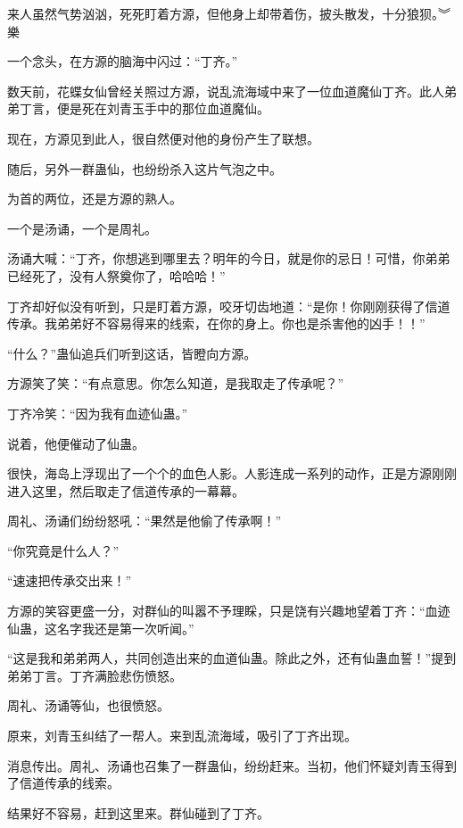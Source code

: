 
\begin{this_body}



来人虽然气势汹汹，死死盯着方源，但他身上却带着伤，披头散发，十分狼狈。︾樂

一个念头，在方源的脑海中闪过：“丁齐。”

数天前，花蝶女仙曾经关照过方源，说乱流海域中来了一位血道魔仙丁齐。此人弟弟丁言，便是死在刘青玉手中的那位血道魔仙。

现在，方源见到此人，很自然便对他的身份产生了联想。

随后，另外一群蛊仙，也纷纷杀入这片气泡之中。

为首的两位，还是方源的熟人。

一个是汤诵，一个是周礼。

汤诵大喊：“丁齐，你想逃到哪里去？明年的今日，就是你的忌日！可惜，你弟弟已经死了，没有人祭奠你了，哈哈哈！”

丁齐却好似没有听到，只是盯着方源，咬牙切齿地道：“是你！你刚刚获得了信道传承。我弟弟好不容易得来的线索，在你的身上。你也是杀害他的凶手！！”

“什么？”蛊仙追兵们听到这话，皆瞪向方源。

方源笑了笑：“有点意思。你怎么知道，是我取走了传承呢？”

丁齐冷笑：“因为我有血迹仙蛊。”

说着，他便催动了仙蛊。

很快，海岛上浮现出了一个个的血色人影。人影连成一系列的动作，正是方源刚刚进入这里，然后取走了信道传承的一幕幕。

周礼、汤诵们纷纷怒吼：“果然是他偷了传承啊！”

“你究竟是什么人？”

“速速把传承交出来！”

方源的笑容更盛一分，对群仙的叫嚣不予理睬，只是饶有兴趣地望着丁齐：“血迹仙蛊，这名字我还是第一次听闻。”

“这是我和弟弟两人，共同创造出来的血道仙蛊。除此之外，还有仙蛊血誓！”提到弟弟丁言。丁齐满脸悲伤愤怒。

周礼、汤诵等仙，也很愤怒。

原来，刘青玉纠结了一帮人。来到乱流海域，吸引了丁齐出现。

消息传出。周礼、汤诵也召集了一群蛊仙，纷纷赶来。当初，他们怀疑刘青玉得到了信道传承的线索。

结果好不容易，赶到这里来。群仙碰到了丁齐。


\end{this_body}
